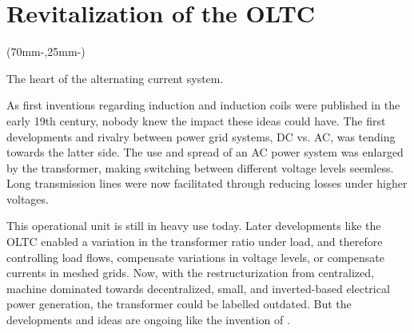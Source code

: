 \begingroup
\chapter{Revitalization of the OLTC} %
\label{chap:intro}

\begin{textblock*}{.7\textwidth}(70mm-\offset,25mm-\offset)%
    \begin{fquote}
        The heart of the alternating current system.
    \end{fquote}
\end{textblock*}

\endgroup

As first inventions regarding induction and induction coils were published in the early 19th century, nobody knew the impact these ideas could have.
The first developments and rivalry between power grid systems, \ac{DC} vs. \ac{AC}, was tending towards the latter side.
The use and spread of an \acs{AC} power system was enlarged by the transformer, making switching between different voltage levels seemless.
Long transmission lines were now facilitated through reducing losses under higher voltages. \quelle

This operational unit is still in heavy use today.
Later developments like the \ac{OLTC} enabled a variation in the transformer ratio under load, and therefore controlling load flows, compensate variations in voltage levels, or compensate currents in meshed grids. \autocite{schwab_2022}
Now, with the restructurization from centralized, machine dominated towards decentralized, small, and inverted-based electrical power generation, the transformer could be labelled outdated.
But the developments and ideas are ongoing like the invention of \textcite{maschinenfabrikreinhausengmbh_2023}.


